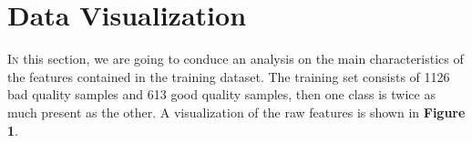 \section{Data Visualization}

\lettrine[nindent=0em,lines=3]{I}n this section, we are going to conduce an analysis on the main characteristics of the features contained in the training dataset. The training set consists of 1126 bad quality samples and 613 good quality samples, then one class is twice as much present as the other. A visualization of the raw features is shown in \textbf{Figure 1}.